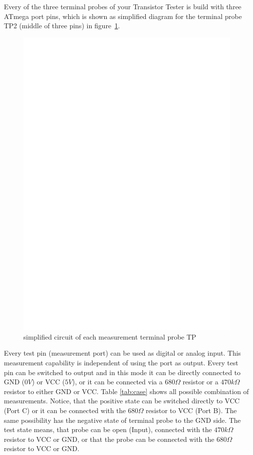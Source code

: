 Every of the three terminal probes of your Transistor Tester is build with three ATmega port pins,
which is shown as simplified diagram for the terminal probe TP2 (middle of three pins) in figure~\ref{fig:terminal}.

\begin{figure}[H]
\centering
\includegraphics[]{../FIG/terminal.eps}
\caption{simplified circuit of each measurement terminal probe TP}
\label{fig:terminal}
\end{figure}

Every test pin (measurement port) can be used as digital or analog input. This measurement capability is
independent of using the port as output.
Every test pin can be switched to output and in this mode it can be directly connected to GND (\(0V\)) or VCC (\(5V\)), 
or it can be connected via a \(680\Omega\) resistor or a \(470k\Omega\) resistor to either GND or VCC.
Table \ref{tab:case} shows all possible combination of measurements.
Notice, that the positive state can be switched directly to VCC (Port C) or it can be connected with the 
\(680\Omega\) resistor to VCC (Port B). The same possibility has the negative state of terminal probe to the GND side.
The test state means, that probe can be open (Input), connected with the \(470k\Omega\) resistor to VCC or GND,
or that the probe can be connected with the \(680\Omega\) resistor to VCC or GND.

